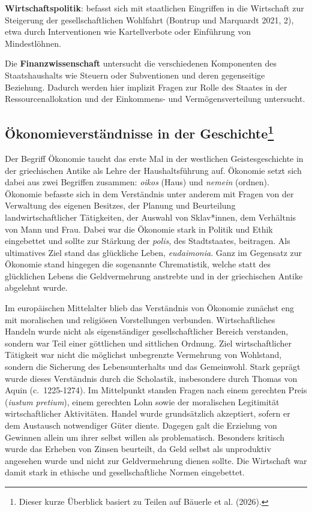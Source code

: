 \documentclass[
  nswissgerman,
  a4paper,
  DIV=11,
  numbers=noendperiod,
  oneside,
  openany]{scrreprt}
\begin{document}
\begin{tcolorbox}
\textbf{Wirtschaftspolitik}: befasst sich mit staatlichen Eingriffen in
die Wirtschaft zur Steigerung der gesellschaftlichen Wohlfahrt (Bontrup
und Marquardt 2021, 2), etwa durch Interventionen wie Kartellverbote
oder Einführung von Mindestlöhnen.

Die \textbf{Finanzwissenschaft} untersucht die verschiedenen Komponenten
des Staatshaushalts wie Steuern oder Subventionen und deren gegenseitige
Beziehung. Dadurch werden hier implizit Fragen zur Rolle des Staates in
der Ressourcenallokation und der Einkommens- und Vermögensverteilung
untersucht.

\end{tcolorbox}

\subsection[Ökonomieverständnisse in der
Geschichte]{\texorpdfstring{Ökonomieverständnisse in der
Geschichte\footnote{Dieser kurze Überblick basiert zu Teilen auf Bäuerle
  et al. (2026).}}{Ökonomieverständnisse in der Geschichte}}\label{uxf6konomieverstuxe4ndnisse-in-der-geschichte1_intro-1}

Der Begriff Ökonomie taucht das erste Mal in der westlichen
Geistesgeschichte in der griechischen Antike als Lehre der
Haushaltsführung auf. Ökonomie setzt sich dabei aus zwei Begriffen
zusammen: \emph{oikos} (Haus) und \emph{nemein} (ordnen). Ökonomie
befasste sich in dem Verständnis unter anderem mit Fragen von der
Verwaltung des eigenen Besitzes, der Planung und Beurteilung
landwirtschaftlicher Tätigkeiten, der Auswahl von Sklav*innen, dem
Verhältnis von Mann und Frau. Dabei war die Ökonomie stark in Politik
und Ethik eingebettet und sollte zur Stärkung der \emph{polis}, des
Stadtstaates, beitragen. Als ultimatives Ziel stand das glückliche
Leben, \emph{eudaimonia}. Ganz im Gegensatz zur Ökonomie stand hingegen
die sogenannte Chrematistik, welche statt des glücklichen Lebens die
Geldvermehrung anstrebte und in der griechischen Antike abgelehnt wurde.

Im europäischen Mittelalter blieb das Verständnis von Ökonomie zunächst
eng mit moralischen und religiösen Vorstellungen verbunden.
Wirtschaftliches Handeln wurde nicht als eigenständiger
gesellschaftlicher Bereich verstanden, sondern war Teil einer göttlichen
und sittlichen Ordnung. Ziel wirtschaftlicher Tätigkeit war nicht die
möglichst unbegrenzte Vermehrung von Wohlstand, sondern die Sicherung
des Lebensunterhalts und das Gemeinwohl. Stark geprägt wurde dieses
Verständnis durch die Scholastik, insbesondere durch Thomas von Aquin
(c.~1225-1274). Im Mittelpunkt standen Fragen nach einem gerechten Preis
(\emph{iustum pretium}), einem gerechten Lohn sowie der moralischen
Legitimität wirtschaftlicher Aktivitäten. Handel wurde grundsätzlich
akzeptiert, sofern er dem Austausch notwendiger Güter diente. Dagegen
galt die Erzielung von Gewinnen allein um ihrer selbst willen als
problematisch. Besonders kritisch wurde das Erheben von Zinsen
beurteilt, da Geld selbst als unproduktiv angesehen wurde und nicht zur
Geldvermehrung dienen sollte. Die Wirtschaft war damit stark in ethische
und gesellschaftliche Normen eingebettet.
\end{document}

